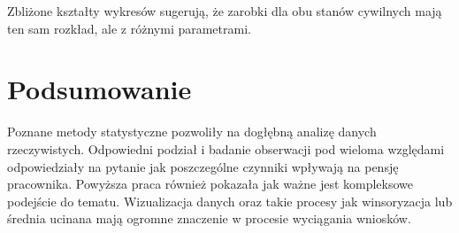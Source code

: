 \documentclass[12pt]{mwart}
\begin{document}
\noindent Zbliżone kształty wykresów sugerują, że zarobki dla obu stanów cywilnych mają ten sam rozkład, ale z różnymi parametrami.
	


\section{Podsumowanie}
\noindent Poznane metody statystyczne pozwoliły na dogłębną analizę danych rzeczywistych. Odpowiedni podział i badanie obserwacji pod wieloma względami odpowiedziały na pytanie jak poszczególne czynniki wpływają na pensję pracownika. Powyższa praca również pokazała jak ważne jest kompleksowe podejście do tematu. Wizualizacja danych oraz takie procesy jak winsoryzacja lub średnia ucinana mają ogromne znaczenie w procesie wyciągania wniosków.
\end{document}

